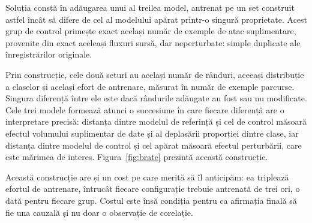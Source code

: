 Soluția constă în adăugarea unui al treilea model, antrenat pe un set construit astfel încât să difere de cel al modelului apărat printr-o singură proprietate. Acest grup de control primește exact același număr de exemple de atac suplimentare, provenite din exact aceleași fluxuri sursă, dar neperturbate: simple duplicate ale înregistrărilor originale.

Prin construcție, cele două seturi au același număr de rânduri, aceeași distribuție a claselor și același efort de antrenare, măsurat în număr de exemple parcurse. Singura diferență între ele este dacă rândurile adăugate au fost sau nu modificate. Cele trei modele formează atunci o succesiune în care fiecare diferență are o interpretare precisă: distanța dintre modelul de referință și cel de control măsoară efectul volumului suplimentar de date și al deplasării proporției dintre clase, iar distanța dintre modelul de control și cel apărat măsoară efectul perturbării, care este mărimea de interes. Figura~\ref{fig:brate} prezintă această construcție.

Această construcție are și un cost pe care merită să îl anticipăm: ea triplează efortul de antrenare, întrucât fiecare configurație trebuie antrenată de trei ori, o dată pentru fiecare grup. Costul este însă condiția pentru ca afirmația finală să fie una cauzală și nu doar o observație de corelație.

